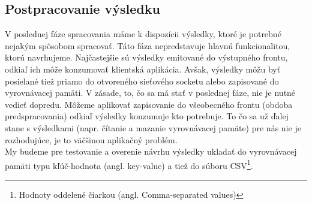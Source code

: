 \subsection{Postpracovanie výsledku}
V poslednej fáze spracovania máme k dispozícii výsledky, ktoré je potrebné nejakým spôsobom spracovať. Táto fáza nepredstavuje hlavnú funkcionalitou, ktorú navrhujeme. Najčastejšie sú výsledky emitované do výstupného frontu, odkiaľ ich môže konzumovať klientská aplikácia. Avšak, výsledky môžu byť posielané tiež priamo do otvoreného sieťového socketu alebo zapisované do vyrovnávacej pamäti. V zásade, to, čo sa má stať v poslednej fáze, nie je nutné vedieť dopredu. Môžeme aplikovať zapisovanie do všeobecného frontu (obdoba predspracovania) odkiaľ výsledky konzumuje kto potrebuje. To čo sa už ďalej stane s výsledkami (napr. čítanie a mazanie vyrovnávacej pamäte) pre nás nie je rozhodujúce, je to väčšinou aplikačný problém. 
\\[5pt]
My budeme pre testovanie a overenie návrhu výsledky ukladať do vyrovnávacej pamäti typu kľúč-hodnota (angl. key-value) a tiež do súboru CSV\footnote{Hodnoty oddelené čiarkou (angl. Comma-separated values)}.

 \newpage
